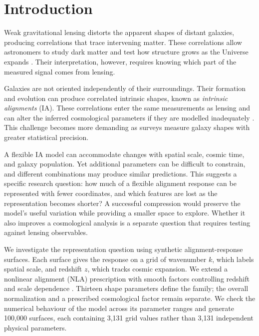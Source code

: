 \section{Introduction}
\label{sec:introduction}

Weak gravitational lensing distorts the apparent shapes of distant galaxies,
producing correlations that trace intervening matter. These correlations
allow astronomers to study
dark matter and test how structure grows as the Universe expands
\citep{2001PhR...340..291B}. Their interpretation, however, requires knowing
which part of the measured signal comes from lensing.

Galaxies are not oriented independently of their surroundings. Their
formation and evolution can produce correlated intrinsic shapes, known as
\emph{intrinsic alignments} (IA). These correlations enter the same
measurements as lensing and can alter the inferred cosmological parameters
if they are modelled inadequately \citep{2025A&ARv..33....5C}. This challenge
becomes more demanding as surveys measure galaxy shapes with greater
statistical precision.

A flexible IA model can accommodate changes with spatial scale, cosmic
time, and galaxy population. Yet additional parameters can be difficult to
constrain, and different combinations may produce similar predictions.
This suggests a specific research question: how much of a flexible
alignment response can be represented with fewer coordinates, and which
features are lost as the representation becomes shorter? A successful
compression would preserve the model's useful variation while providing a
smaller space to explore. Whether it also improves a cosmological analysis
is a separate question that requires testing against lensing observables.

We investigate the representation question using synthetic alignment-response
surfaces. Each surface gives the response on a grid of wavenumber $k$,
which labels spatial scale, and redshift $z$, which tracks cosmic expansion.
We extend a nonlinear alignment (NLA) prescription with smooth factors controlling
redshift and scale dependence \citep{2007NJPh....9..444B}. Thirteen shape
parameters define the family; the overall normalization and a prescribed
cosmological factor remain separate. We check the numerical behaviour of
the model across its parameter ranges and generate 100,000 surfaces, each
containing 3,131 grid values rather than 3,131 independent physical parameters.

